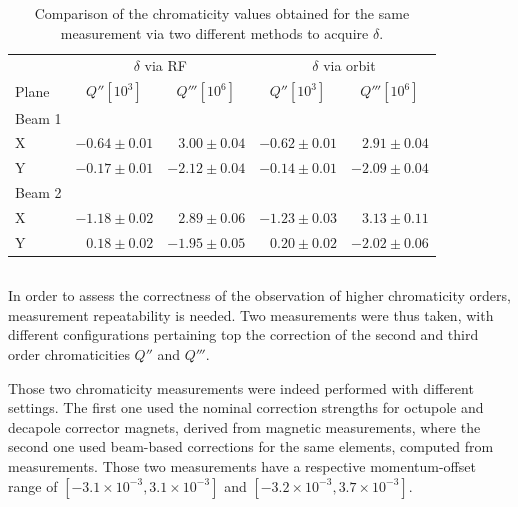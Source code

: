 \begin{table}[!htb]
    \centering
    \begin{tabular}{lrrrr}
        \toprule
              & \multicolumn{2}{c}{$\delta$ via RF}  &  \multicolumn{2}{c}{$\delta$ via orbit} \\
        Plane & \multicolumn{1}{c}{$Q'' [10^3]$}     & \multicolumn{1}{c}{$Q''' [10^6]$} & \multicolumn{1}{c}{$Q'' [10^3]$} & \multicolumn{1}{c}{$Q''' [10^6]$}\\
        \midrule
        Beam 1 &&&& \\
        \hspace{2mm}X & $-0.64 \pm 0.01$ & $ 3.00 \pm 0.04$   & $-0.62 \pm 0.01$ & $ 2.91 \pm 0.04$ \\
        \hspace{2mm}Y & $-0.17 \pm 0.01$ & $-2.12 \pm 0.04$   & $-0.14 \pm 0.01$ & $-2.09 \pm 0.04$ \\
        Beam 2 &&&& \\
        \hspace{2mm}X & $-1.18 \pm 0.02$ & $ 2.89 \pm 0.06$   & $-1.23 \pm 0.03$ & $ 3.13 \pm 0.11$ \\
        \hspace{2mm}Y & $ 0.18 \pm 0.02$ & $-1.95 \pm 0.05$   & $ 0.20 \pm 0.02$ & $-2.02 \pm 0.06$ \\
        \bottomrule
    \end{tabular}
    \caption{Comparison of the chromaticity values obtained for the same measurement via two
    different methods to acquire $\delta$.}
    \label{table:very_high_orders:bare_chroma_2016}
  \end{table}


\subsection{}

In order to assess the correctness of the observation of higher chromaticity orders, measurement
repeatability is needed. Two measurements were thus taken, with different configurations pertaining
top the correction of the second and third order chromaticities $Q''$ and $Q'''$.

Those two chromaticity measurements were indeed performed with different settings. The first one
used the nominal correction strengths for octupole and decapole corrector magnets, derived from
magnetic measurements, where the second one used beam-based corrections for the same elements,
computed from measurements. 
Those two measurements have a respective momentum-offset range of $[-3.1 \times 10^{-3}, 3.1 \times
10^{-3}]$ and $[-3.2 \times 10^{-3}, 3.7 \times 10^{-3}]$.

